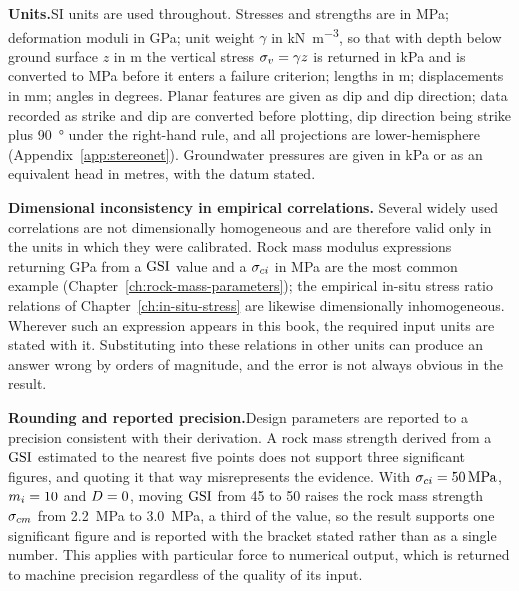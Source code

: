 \noindent\textbf{Units.}\enspace SI units are used throughout. Stresses and
strengths are in \si{\mega\pascal}; deformation moduli in \si{\giga\pascal};
unit weight $\gamma$ in \si{\kilo\newton\per\metre\cubed}, so that with depth
below ground surface $z$ in \si{\metre} the vertical stress $\sigma_v = \gamma z$
is returned in \si{\kilo\pascal} and is converted to \si{\mega\pascal} before
it enters a failure criterion; lengths in \si{\metre};
displacements in \si{\milli\metre}; angles in degrees. Planar features are
given as dip and dip direction; data recorded as strike and dip are converted
before plotting, dip direction being strike plus \SI{90}{\degree} under the
right-hand rule, and all projections are lower-hemisphere
(Appendix~\ref{app:stereonet}). Groundwater pressures are given in
\si{\kilo\pascal} or as an equivalent head in metres, with the datum stated.

\noindent\textbf{Dimensional inconsistency in empirical correlations.}\enspace
Several widely used correlations are not dimensionally homogeneous and are
therefore valid only in the units in which they were calibrated. Rock mass
modulus expressions returning \si{\giga\pascal} from a $\mathrm{GSI}$ value and a
$\sigma_{ci}$ in \si{\mega\pascal} are the most common example
(Chapter~\ref{ch:rock-mass-parameters}); the empirical in-situ stress ratio
relations of Chapter~\ref{ch:in-situ-stress} are likewise dimensionally
inhomogeneous. Wherever such an
expression appears in this book, the required input units are stated with it.
Substituting into these relations in other units can
produce an answer wrong by orders of magnitude, and the error is not always
obvious in the result.

\noindent\textbf{Rounding and reported precision.}\enspace Design parameters
are reported to a precision consistent with their derivation. A rock mass
strength derived from a $\mathrm{GSI}$ estimated to the nearest five points does not
support three significant figures, and quoting it that way misrepresents the
evidence. With $\sigma_{ci} = \SI{50}{\mega\pascal}$, $m_i = 10$ and $D = 0$,
moving $\mathrm{GSI}$ from 45 to 50 raises the rock mass strength $\sigma_{cm}$ from
\SI{2.2}{\mega\pascal} to \SI{3.0}{\mega\pascal}, a third of the value, so
the result supports one significant figure and is reported with the bracket
stated rather than as a single number. This applies with particular force to numerical output, which is
returned to machine precision regardless of the quality of its input.
